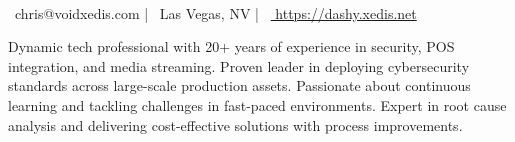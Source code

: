 \documentclass[]{resume-format}
\begin{document}
\begin{center}
      \\
    \vspace{2mm}
    {\faEnvelope\ chris@voidxedis.com} | {\faMapMarker\ Las Vegas, NV} | {\faLink\ \href{ https://dashy.xedis.net }{ https://dashy.xedis.net }}
\end{center}


\begin{cvpersonalstatement}
  \item { Dynamic tech professional with 20+ years of experience in security, POS integration, and media streaming. Proven leader in deploying cybersecurity standards across large-scale production assets. Passionate about continuous learning and tackling challenges in fast-paced environments. Expert in root cause analysis and delivering cost-effective solutions with process improvements. }
\end{cvpersonalstatement}


\end{document}
